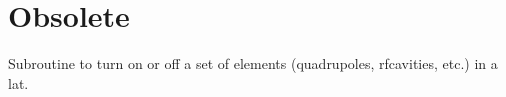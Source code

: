 \section{Obsolete}
\label{r:obs}      

\begin{description}

\item[set_on (key, lat, on_switch, orb)] \Newline
Subroutine to turn on or off a set of elements (quadrupoles, rfcavities, etc.) in a lat. 

\end{description}

